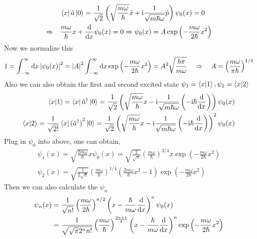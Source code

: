 \begin{align*}
    & \bra{x} \hat{a} \ket{0} = \frac{1}{\sqrt{2}} \left( \sqrt{\frac{m \omega}{\hbar}}\hat{x} + \mathrm{i} \frac{1}{\sqrt{m \hbar \omega}} \hat{p} \right) \psi_0(x) = 0 \\
    \Rightarrow \quad&\frac{m \omega}{\hbar} x + \frac{\mathrm{d}}{\mathrm{d} x} \psi_0(x) = 0 \Rightarrow \psi_0(x) = A \exp\left(-\frac{m \omega }{2 \hbar} x^2\right)
\end{align*}
Now we normalize this 
\begin{eqnarray}
    1 = \int_{-\infty}^{\infty} \mathrm{d} x \left| \psi_0(x) \right|^2 = \left| A \right|^2 \int_{-\infty}^{\infty} \mathrm{d} x \exp\left(-\frac{m \omega }{2 \hbar} x^2\right) = A^2 \sqrt{\frac{\hbar \pi}{m \omega}} \quad \Rightarrow \quad A = \left(\frac{m \omega}{\pi \hbar}\right)^{1/4}
\end{eqnarray}
Also we can also obtain the first and second excited state $\psi_1 = \braket{x|1}, \psi_1 = \braket{x|2}$
\begin{align*}
    \braket{x|1} = \bra{x}\hat{a}^ \dag \ket{0} = \frac{1}{\sqrt{2}} \left( \sqrt{\frac{m \omega}{\hbar}} x - \mathrm{i} \frac{1}{\sqrt{m \hbar \omega}} \left(- \mathrm{i} \hbar \frac{\mathrm{d}}{\mathrm{d} x}\right) \right) \psi_0(x) \\
    \braket{x|2} = \frac{1}{\sqrt{2!}}\bra{x}{(\hat{a}^ \dag)}^2\ket{0} = \frac{1}{\sqrt{2}} \left( \sqrt{\frac{m \omega}{\hbar}} x - \mathrm{i} \frac{1}{\sqrt{m \hbar \omega}} \left(- \mathrm{i} \hbar \frac{\mathrm{d}}{\mathrm{d} x}\right) \right)^2 \psi_0(x)
\end{align*}
Plug in $\psi_0$ into above, one can obtain, 
\begin{align}
    \psi_1(x) = \sqrt{\frac{2 m \omega}{\hbar}} x \psi_0(x) = \sqrt{\frac{2}{\sqrt{\pi}}} \left(\frac{m \omega}{\hbar}\right)^{3/4}x \exp \left(- \frac{m \omega}{2 \hbar}x^2\right) \\
    \psi_2(x) = \sqrt{\frac{1}{2\sqrt{\pi}}}\left(\frac{m \omega}{\hbar}\right)^{1/4} \left(\frac{2m\omega}{\hbar}x^2-1\right)\exp \left(-\frac{m \omega}{2\hbar}x^2\right)
\end{align}
Then we can also calculate the $\psi_n$
\begin{align}
    \psi_n(x) &= \frac{1}{\sqrt{n!}} \left(\frac{m \omega}{2\hbar}\right)^{n/2} \left(x - \frac{\hbar}{m \omega} \frac{\mathrm{d}}{\mathrm{d} x}\right)^n \psi_0(x) \notag \\
    &= \frac{1}{\sqrt{ \sqrt{\pi}2^n n!}} \left(\frac{m \omega}{\hbar}\right)^{\frac{2n+1}{4}}  \left(x - \frac{\hbar}{m \omega} \frac{\mathrm{d}}{\mathrm{d} x}\right)^n \exp\left(- \frac{m \omega}{2 \hbar}x^2\right) \label{eq:psin_beforesolution}
\end{align}
